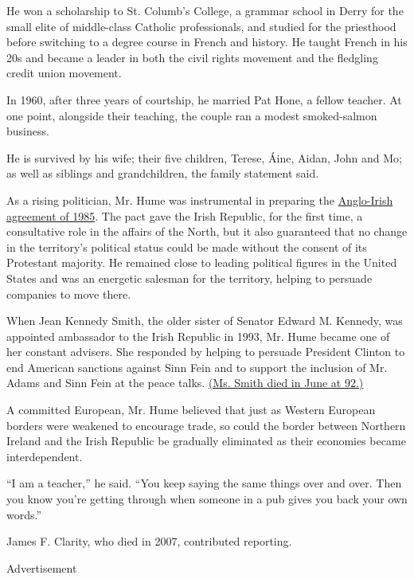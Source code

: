 He won a scholarship to St. Columb's College, a grammar school in Derry
for the small elite of middle-class Catholic professionals, and studied
for the priesthood before switching to a degree course in French and
history. He taught French in his 20s and became a leader in both the
civil rights movement and the fledgling credit union movement.

In 1960, after three years of courtship, he married Pat Hone, a fellow
teacher. At one point, alongside their teaching, the couple ran a modest
smoked-salmon business.

He is survived by his wife; their five children, Terese, Áine, Aidan,
John and Mo; as well as siblings and grandchildren, the family statement
said.

As a rising politician, Mr. Hume was instrumental in preparing the
\href{https://www.nytimes.com/1985/11/24/weekinreview/anglo-irish-agreement-pits-both-ends-against-the-middle.html}{Anglo-Irish
agreement of 1985}. The pact gave the Irish Republic, for the first
time, a consultative role in the affairs of the North, but it also
guaranteed that no change in the territory's political status could be
made without the consent of its Protestant majority. He remained close
to leading political figures in the United States and was an energetic
salesman for the territory, helping to persuade companies to move there.

When Jean Kennedy Smith, the older sister of Senator Edward M. Kennedy,
was appointed ambassador to the Irish Republic in 1993, Mr. Hume became
one of her constant advisers. She responded by helping to persuade
President Clinton to end American sanctions against Sinn Fein and to
support the inclusion of Mr. Adams and Sinn Fein at the peace talks.
\href{https://www.nytimes.com/2020/06/18/us/politics/jean-kennedy-smith-dead.html}{(Ms.
Smith died in June at 92.)}

A committed European, Mr. Hume believed that just as Western European
borders were weakened to encourage trade, so could the border between
Northern Ireland and the Irish Republic be gradually eliminated as their
economies became interdependent.

``I am a teacher,'' he said. ``You keep saying the same things over and
over. Then you know you're getting through when someone in a pub gives
you back your own words.''

James F. Clarity, who died in 2007, contributed reporting.

Advertisement

